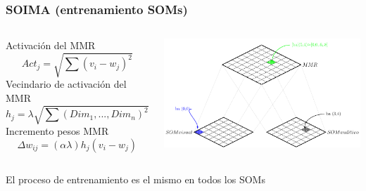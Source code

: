 \documentclass{beamer}
\begin{document}
\begin{frame}
\frametitle{SOIMA (entrenamiento SOMs)}
\begin{columns}
\begin{tiny}
Activación del MMR
  \begin{equation}
    Act_{j}=\sqrt{\sum (v_{i}-w_{j})^{2}}
  \end{equation}
Vecindario de activación del MMR
   \begin{equation}
    h_{j}= \lambda  \sqrt{ \sum(Dim_{1},...,Dim_{n})^{2}}
  \end{equation}
Incremento pesos MMR
    \begin{equation}
    \Delta w_{ij}= (\alpha\lambda)h_{j}(v_{i}-w_{j})
  \end{equation}
\end{tiny}
\includegraphics[width=\textwidth]{images/soima2}
\end{columns}
\begin{tiny}
El proceso de entrenamiento es el mismo en todos los SOMs
\end{tiny}
\end{frame}
\end{document}
